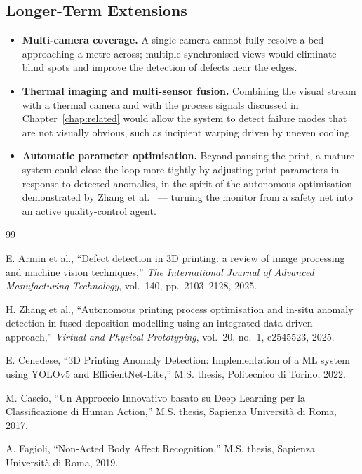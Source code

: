 \documentclass[english, Lau, oneside]{sapthesis}
\begin{document}
\subsection{Longer-Term Extensions}
\begin{itemize}
    \item \textbf{Multi-camera coverage.} A single camera cannot fully resolve a bed approaching a metre across; multiple synchronised views would eliminate blind spots and improve the detection of defects near the edges.
    \item \textbf{Thermal imaging and multi-sensor fusion.} Combining the visual stream with a thermal camera and with the process signals discussed in Chapter~\ref{chap:related} would allow the system to detect failure modes that are not visually obvious, such as incipient warping driven by uneven cooling.
    \item \textbf{Automatic parameter optimisation.} Beyond pausing the print, a mature system could close the loop more tightly by adjusting print parameters in response to detected anomalies, in the spirit of the autonomous optimisation demonstrated by Zhang et al.\ \cite{zhang2025} --- turning the monitor from a safety net into an active quality-control agent.
\end{itemize}


\backmatter



\begin{thebibliography}{99}




E. Armin et al., ``Defect detection in 3D printing: a review of image processing and machine vision techniques,'' \textit{The International Journal of Advanced Manufacturing Technology}, vol.~140, pp.~2103--2128, 2025.




H. Zhang et al., ``Autonomous printing process optimisation and in-situ anomaly detection in fused deposition modelling using an integrated data-driven approach,'' \textit{Virtual and Physical Prototyping}, vol.~20, no.~1, e2545523, 2025.




E. Cenedese, ``3D Printing Anomaly Detection: Implementation of a ML system using YOLOv5 and EfficientNet-Lite,'' M.S. thesis, Politecnico di Torino, 2022.




M. Cascio, ``Un Approccio Innovativo basato su Deep Learning per la Classificazione di Human Action,'' M.S. thesis, Sapienza Università di Roma, 2017.




A. Fagioli, ``Non-Acted Body Affect Recognition,'' M.S. thesis, Sapienza Università di Roma, 2019.



\end{thebibliography}
\end{document}

